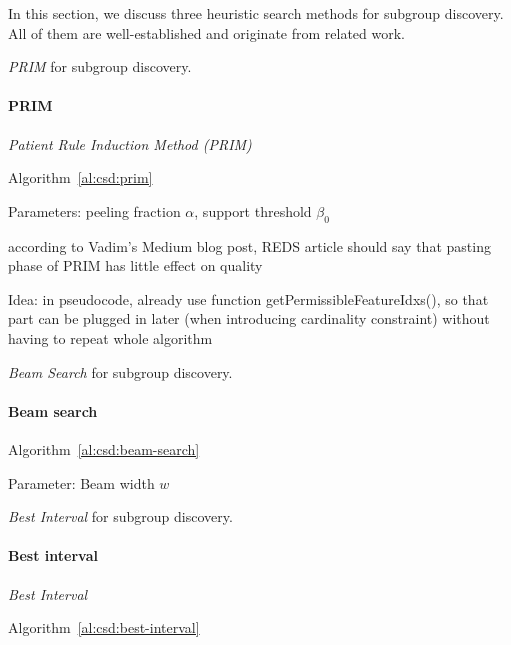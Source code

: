 \documentclass{article}
\theoremstyle{definition}
\begin{document}
In this section, we discuss three heuristic search methods for subgroup discovery.
All of them are well-established and originate from related work.

\begin{algorithm}[t]
	\DontPrintSemicolon
	\caption{\emph{PRIM} for subgroup discovery.}
	\label{al:csd:prim}
\end{algorithm}

\paragraph{PRIM}

\emph{Patient Rule Induction Method (PRIM)}~\cite{friedman1999bump}

Algorithm~\ref{al:csd:prim}

Parameters: peeling fraction $\alpha$, support threshold $\beta_0$

according to Vadim's Medium blog post, REDS article should say that pasting phase of PRIM has little effect on quality

Idea: in pseudocode, already use function getPermissibleFeatureIdxs(), so that part can be plugged in later (when introducing cardinality constraint) without having to repeat whole algorithm

\begin{algorithm}[t]
	\DontPrintSemicolon
	\caption{\emph{Beam Search} for subgroup discovery.}
	\label{al:csd:beam-search}
\end{algorithm}

\paragraph{Beam search}

Algorithm~\ref{al:csd:beam-search}

Parameter: Beam width $w$

\begin{algorithm}[t]
	\DontPrintSemicolon
	\caption{\emph{Best Interval} for subgroup discovery.}
	\label{al:csd:best-interval}
\end{algorithm}

\paragraph{Best interval}

\emph{Best Interval}~\cite{mampaey2012efficient}

Algorithm~\ref{al:csd:best-interval}
\end{document}
